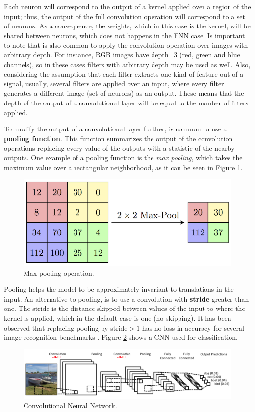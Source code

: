 Each neuron will correspond to the output of a kernel applied over a region of the input; thus, the output of the full convolution operation will correspond to a set of neurons. As a consequence, the weights, which in this case is the kernel, will be shared between neurons, which does not happens in the FNN case. Is important to note that is also common to apply the convolution operation over images with arbitrary depth. For instance, RGB images have depth=3 (red, green and blue channels), so in these cases filters with arbitrary depth may be used as well. Also, considering the assumption that each filter extracts one kind of feature out of a signal, usually, several filters are applied over an input, where every filter generates a different image (set of neurons) as an output. These means that the depth of the output of a convolutional layer will be equal to the number of filters applied.

To modify the output of a convolutional layer further, is common to use a \textbf{pooling function}. This function summarizes the output of the convolution operations replacing every value of the outputs with a statistic of the nearby outputs. One example of a pooling function is the \emph{max pooling}, which takes the maximum value over a rectangular neighborhood, as it can be seen in Figure \ref{fig:maxpool}. 

\begin{figure}[H]
    \centering
    \includegraphics[width=0.4\linewidth]{imagenes/cap1/max_pool.png}
    \caption{Max pooling operation.}
    \label{fig:maxpool}
\end{figure}

Pooling helps the model to be approximately invariant to translations in the input. An alternative to pooling, is to use a convolution with \textbf{stride} greater than one. The stride is the distance skipped between values of the input to where the kernel is applied, which in the default case is one (no skipping). It has been observed that replacing pooling by stride$>1$ has no loss in accuracy for several image recognition benchmarks \cite{springenberg2014striving}. Figure \ref{fig:cnn} shows a CNN used for classification.
    
\begin{figure}[H]
\centering
\includegraphics[width=0.9\linewidth]{imagenes/cap1/cnn.png}
\caption{Convolutional Neural Network.}
\label{fig:cnn}
\end{figure}

